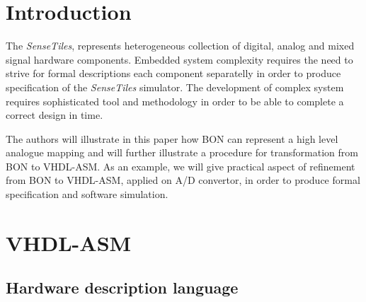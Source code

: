 \documentclass{article}
\newcommand{\STs}{\emph{SenseTiles}\xspace}
\begin{document}
\section{Introduction}
The \STs, represents heterogeneous collection of digital, analog 
and mixed signal hardware components. Embedded system complexity 
requires the need to strive for formal descriptions each component 
separatelly in order to produce specification of the \STs simulator. 
The development of complex system requires sophisticated tool and methodology 
in order to be able to complete a correct design in time.  

The authors will illustrate in this paper how BON can represent a high 
level analogue mapping and will further illustrate a procedure for 
transformation from BON to VHDL-ASM. As an example, 
we will give practical aspect of refinement from BON to VHDL-ASM,
applied on A/D convertor, in order to produce formal specification 
and software simulation.


\section{VHDL-ASM}
\subsection{Hardware description language}
\end{document}
